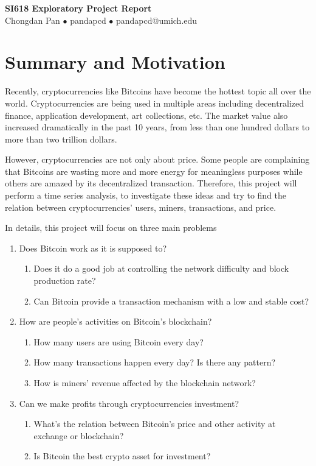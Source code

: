 \documentclass[a4paper]{article}
\begin{document}
\begin{center}
    \Large{\textbf{SI618 Exploratory Project Report}}\\
    \large{Chongdan Pan $\bullet$ pandapcd $\bullet$ pandapcd@umich.edu}
\end{center}
\section{Summary and Motivation}
Recently, cryptocurrencies like Bitcoins have become the hottest topic all over the world. Cryptocurrencies are being used in multiple areas including decentralized finance, application development, art collections, etc. The market value also increased dramatically in the past 10 years, from less than one hundred dollars to more than two trillion dollars.

\par However, cryptocurrencies are not only about price. Some people are complaining that Bitcoins are wasting more and more energy for meaningless purposes while others are amazed by its decentralized transaction. Therefore, this project will perform a time series analysis, to investigate these ideas and try to find the relation between cryptocurrencies' users, miners, transactions, and price.

\par In details, this project will focus on three main problems
\begin{enumerate}[1]
    \item Does Bitcoin work as it is supposed to?
        \begin{enumerate}
            \item Does it do a good job at controlling the network difficulty and block production rate?
            \item Can Bitcoin provide a transaction mechanism with a low and stable cost?
        \end{enumerate}
    \item How are people's activities on Bitcoin's blockchain?
        \begin{enumerate}
            \item How many users are using Bitcoin every day?
            \item How many transactions happen every day? Is there any pattern?
            \item How is miners' revenue affected by the blockchain network?
        \end{enumerate}
    \item Can we make profits through cryptocurrencies investment?
        \begin{enumerate}
            \item What's the relation between Bitcoin's price and other activity at exchange or blockchain?
            \item Is Bitcoin the best crypto asset for investment?
        \end{enumerate}
\end{enumerate}
\end{document}
